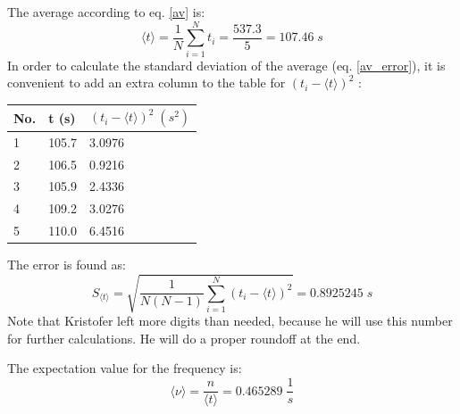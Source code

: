 \documentclass[12pt,a4paper]{article}
\begin{document}
The average according to eq. \ref{av} is:
\begin{equation}
\langle t\rangle = \frac{1}{N}\sum_{i=1}^N t_i = \frac{537.3}{5}=107.46\;s
\end{equation}
In order to calculate the standard deviation of the average (eq. \ref{av_error}), it is convenient to add an extra column to the table for $(t_i-\langle t\rangle)^2$ :

\begin{center}
  \begin{tabular}{ | p{0.5cm} | p{1cm} |p{2.5cm}|}
    \hline
  	No. & t (s) & $(t_i-\langle t\rangle)^2\;\left(s^2\right)$ \\ \hline
    \hline
    \vspace{0.01cm} 1 & \vspace{0.01cm}105.7 & \vspace{0.01cm}3.0976\\ \hline
    \vspace{0.01cm} 2 & \vspace{0.01cm}106.5 & \vspace{0.01cm}0.9216\\ \hline
    \vspace{0.01cm} 3 & \vspace{0.01cm}105.9 & \vspace{0.01cm}2.4336\\\hline
    \vspace{0.01cm} 4 & \vspace{0.01cm}109.2 & \vspace{0.01cm}3.0276\\ \hline
    \vspace{0.01cm} 5 & \vspace{0.01cm}110.0 & \vspace{0.01cm}6.4516\\ \hline
  \end{tabular}
\end{center}
The error is found as:
\begin{equation}
S_{\langle t\rangle} =\sqrt{ \frac{1}{N(N-1)}\sum_{i=1}^N (t_i-\langle t\rangle)^2} = 0.8925245\;s
\end{equation}
Note that Kristofer left more digits than needed, because he will use this number for further calculations. He will do a proper roundoff at the end.

The expectation value for the frequency is:
\begin{equation}
\langle\nu\rangle= \frac{n}{\langle t\rangle} = 0.465289 \;\frac{1}{s}
\end{equation}
\end{document}
